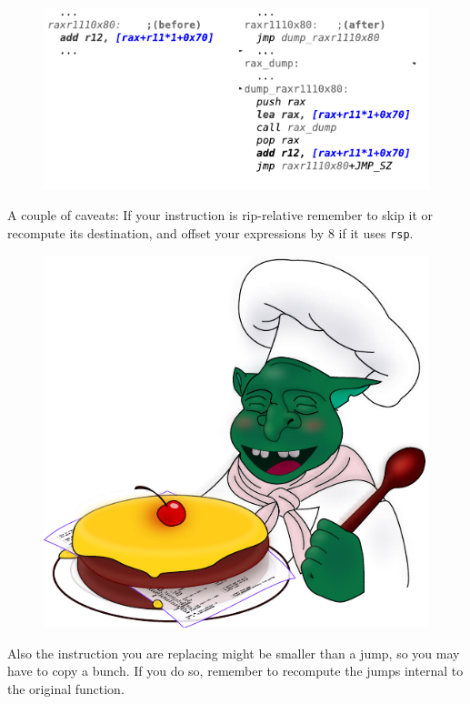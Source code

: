 \documentclass[twocolumn, 10pt]{article}
\begin{document}
\begin{figure}[h!]
\centering
\def\svgwidth{0.5\columnwidth}
\includegraphics{ass}
\end{figure}

A couple of caveats: If your instruction is rip-relative remember to skip it or recompute its
destination, and offset your expressions by 8 if it uses \texttt{rsp}.

\begin{figure}
\centering
\def\svgwidth{0.5\columnwidth}
\includegraphics{gobbo}
\end{figure}

Also the instruction you are replacing might be smaller than a jump, so you may have to copy a bunch.
If you do so, remember to recompute the jumps internal to the original function.
\end{document}
